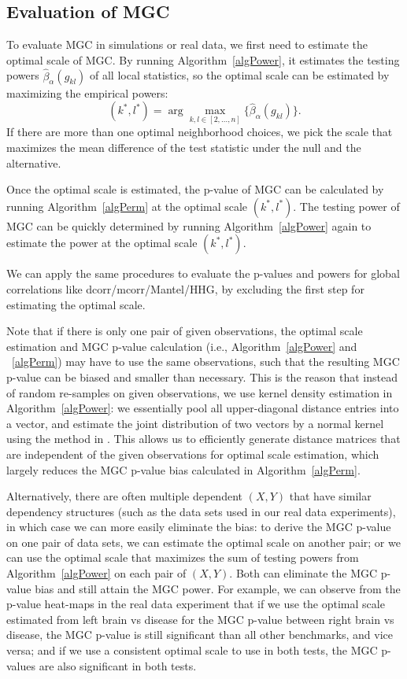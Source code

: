 \documentclass[11pt]{article}
\begin{document}
\subsection{Evaluation of MGC}
\label{appen:eval}

To evaluate MGC in simulations or real data, we first need to estimate the optimal scale of MGC. By running Algorithm~\ref{algPower}, it estimates the testing powers $\hat{\beta}_{\alpha}(g_{kl})$ of all local statistics, so the optimal scale can be estimated by maximizing the empirical powers:
\begin{equation}
\label{power}
(k^{*},l^{*})=\arg\max_{k,l \in [2,\ldots,n] }\{\hat{\beta}_{\alpha}(g_{kl})\}.
\end{equation}
If there are more than one optimal neighborhood choices, we pick the scale that maximizes the mean difference of the test statistic under the null and the alternative.

Once the optimal scale is estimated, the p-value of MGC can be calculated by running Algorithm~\ref{algPerm} at the optimal scale $(k^{*},l^{*})$. The testing power of MGC can be quickly determined by running Algorithm~\ref{algPower} again to estimate the power at the optimal scale $(k^{*},l^{*})$. 

We can apply the same procedures to evaluate the p-values and powers for global correlations like dcorr/mcorr/Mantel/HHG, by excluding the first step for estimating the optimal scale. 

Note that if there is only one pair of given observations, the optimal scale estimation and MGC p-value calculation (i.e., Algorithm~\ref{algPower} and ~\ref{algPerm}) may have to use the same observations, such that the resulting MGC p-value can be biased and smaller than necessary. This is the reason that instead of random re-samples on given observations, we use kernel density estimation in Algorithm~\ref{algPower}: we essentially pool all upper-diagonal distance entries into a vector, and estimate the joint distribution of two vectors by a normal kernel using the method in \cite{BotevEtAl2010}. This allows us to efficiently generate distance matrices that are independent of the given observations for optimal scale estimation, which largely reduces the MGC p-value bias calculated in Algorithm~\ref{algPerm}. 

Alternatively, there are often multiple dependent $(X,Y)$ that have similar dependency structures (such as the data sets used in our real data experiments), in which case we can more easily eliminate the bias: to derive the MGC p-value on one pair of data sets, we can estimate the optimal scale on another pair; or we can use the optimal scale that maximizes the sum of testing powers from Algorithm~\ref{algPower} on each pair of $(X,Y)$. Both can eliminate the MGC p-value bias and still attain the MGC power. For example, we can observe from the p-value heat-maps in the real data experiment that if we use the optimal scale estimated from left brain vs disease for the MGC p-value between right brain vs disease, the MGC p-value is still significant than all other benchmarks, and vice versa; and if we use a consistent optimal scale to use in both tests, the MGC p-values are also significant in both tests. 
\end{document}
